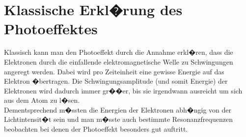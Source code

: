 \documentclass[a4paper, 10pt]{report}%
\begin{document}
\section{Klassische Erkl�rung des Photoeffektes}
Klassisch kann man den Photoeffekt durch die Annahme erkl�ren, dass die Elektronen durch die einfallende elektromagnetische Welle zu Schwingungen angeregt werden. Dabei wird pro Zeiteinheit eine gewisse Energie auf das Elektron �bertragen. Die Schwingungsamplitude (und somit Energie) der Elektronen wird dadurch immer gr��er, bis sie irgendwann ausreicht um sich aus dem Atom zu l�sen.\\
Dementsprechend m�ssten die Energien der Elektronen abh�ngig von der Lichtintensit�t sein und man m�sste auch bestimmte Resonanzfrequenzen beobachten bei denen der Photoeffekt besonders gut auftritt.
\end{document}
